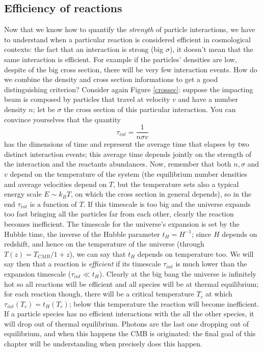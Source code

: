 \documentclass[11pt, a4paper,oneside,openright]{book}
\numberwithin{equation}{section}
\begin{document}
\subsection{Efficiency of reactions}
Now that we know how to quantify the \textit{strength} of particle interactions, we have to understand when a particular reaction is considered efficient in cosmological contexts: the fact that an interaction is strong (big $\sigma$), it doesn't mean that the same interaction is efficient. For example if the particles' densities are low, despite of the big cross section, there will be very few interaction events. How do we combine the density and cross section informations to get a good distinguishing criterion? Consider again Figure \ref{crossec}: suppose the impacting beam is composed by particles that travel at velocity $v$ and have a number density $n$; let be $\sigma$ the cross section of this particular interaction. You can convince yourselves that the quantity
\begin{equation}
\tau_{int}=\frac{1}{n\sigma v}
\end{equation} 
has the dimensions of time and represent the average time that elapses by two distinct interaction events; this average time depends jointly on the strength of the interaction and the reactants abundances. Now, remember that both $n,\sigma$ and $v$ depend on the temperature of the system (the equilibrium number densities and average velocities depend on $T$, but the temperature sets also a typical energy scale $E\sim k_BT$, on which the cross section in general depends), so in the end $\tau_{int}$ is a function of $T$. If this timescale is too big and the universe expands too fast bringing all the particles far from each other, clearly the reaction becomes inefficient. The timescale for the universe's expansion is set by the Hubble time, the inverse of the Hubble parameter $t_H=H^{-1}$; since $H$ depends on redshift, and hence on the temperature of the universe (through $T(z)=T_{CMB}/1+z$), we can say that $t_H$ depends on temperature too. We will say then that a reaction is \textit{efficient} if its 
timescale $\tau_{int}$ is much lower than the expansion timescale ($\tau_{int}\ll t_H$). Clearly at the big bang the universe is infinitely hot so all reactions will be efficient and all species will be at thermal equilibrium; for each reaction though, there will be a critical temperature $T_c$ at which $\tau_{int}(T_c)=t_H(T_c)$; below this temperature the reaction will become inefficient. If a particle species has no efficient interactions with the all the other species, it will drop out of thermal equilibrium. Photons are the last one dropping out of equilibrium, and when this happens the CMB is originated: the final goal of this chapter will be understanding when precisely does this happen. 
\end{document}
